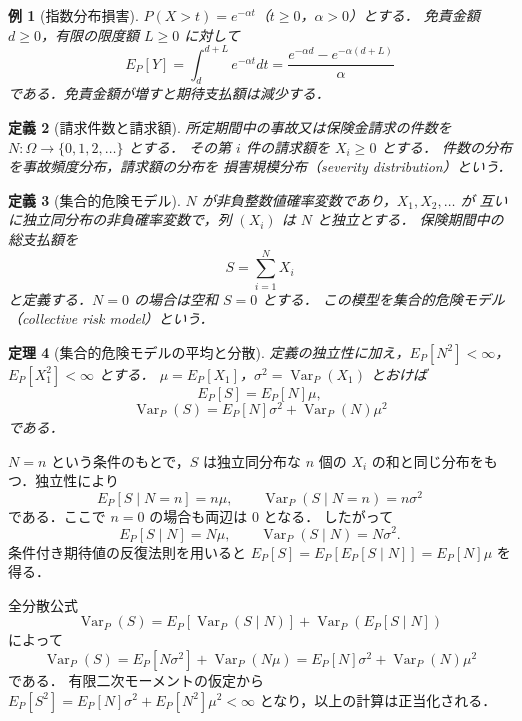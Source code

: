 \documentclass[a5paper,10pt,onecolumn]{jsarticle}
\makeatletter
\theoremstyle{mathnotetheorem}
\newtheorem{theorem}{定理}[section]
\newtheorem{definition}[theorem]{定義}
\newtheorem{example}[theorem]{例}
\renewcommand{\proofname}{証明}
\renewenvironment{proof}[1][\proofname]{%
  \par\pushQED{\qed}\normalfont\topsep4\p@\@plus2\p@\relax
  \trivlist\item[\hskip\labelsep\bfseries #1]\ignorespaces
}{\popQED\endtrivlist\@endpefalse}
\makeatother
\begin{document}
\begin{example}[指数分布損害]
$P(X>t)=e^{-\alpha t}$（$t\ge0$，$\alpha>0$）とする．
免責金額 $d\ge0$，有限の限度額 $L\ge0$ に対して
\[
 E_P[Y]=\int_d^{d+L}e^{-\alpha t}dt
 =\frac{e^{-\alpha d}-e^{-\alpha(d+L)}}{\alpha}
\]
である．免責金額が増すと期待支払額は減少する．
\end{example}

\begin{definition}[請求件数と請求額]
所定期間中の事故又は保険金請求の\emph{件数}を
$N:\Omega\to\{0,1,2,\ldots\}$ とする．
その第 $i$ 件の\emph{請求額}を $X_i\ge0$ とする．
件数の分布を\emph{事故頻度分布}，請求額の分布を
\emph{損害規模分布}（severity distribution）という．
\end{definition}

\begin{definition}[集合的危険モデル]
$N$ が非負整数値確率変数であり，$X_1,X_2,\ldots$ が
互いに独立同分布の非負確率変数で，列 $(X_i)$ は $N$ と独立とする．
保険期間中の総支払額を
\[
 S=\sum_{i=1}^{N}X_i
\]
と定義する．$N=0$ の場合は空和 $S=0$ とする．
この模型を\emph{集合的危険モデル}（collective risk model）という．
\end{definition}

\begin{theorem}[集合的危険モデルの平均と分散]\label{thm:aggregate}
定義の独立性に加え，$E_P[N^2]<\infty$，$E_P[X_1^2]<\infty$ とする．
$\mu=E_P[X_1]$，$\sigma^2=\operatorname{Var}_P(X_1)$ とおけば
\[
 E_P[S]=E_P[N]\mu,
\]
\begin{equation}\label{eq:aggregatevar}
 \operatorname{Var}_P(S)=E_P[N]\sigma^2
 +\operatorname{Var}_P(N)\mu^2
\end{equation}
である．
\end{theorem}
\begin{proof}
$N=n$ という条件のもとで，$S$ は独立同分布な $n$ 個の
$X_i$ の和と同じ分布をもつ．独立性により
\[
 E_P[S\mid N=n]=n\mu,\qquad
 \operatorname{Var}_P(S\mid N=n)=n\sigma^2
\]
である．ここで $n=0$ の場合も両辺は $0$ となる．
したがって
\[
 E_P[S\mid N]=N\mu,
 \qquad\operatorname{Var}_P(S\mid N)=N\sigma^2.
\]
条件付き期待値の反復法則を用いると
$E_P[S]=E_P[E_P[S\mid N]]=E_P[N]\mu$ を得る．

全分散公式
\[
 \operatorname{Var}_P(S)=
 E_P[\operatorname{Var}_P(S\mid N)]
 +\operatorname{Var}_P(E_P[S\mid N])
\]
によって
\[
 \operatorname{Var}_P(S)=E_P[N\sigma^2]
 +\operatorname{Var}_P(N\mu)
 =E_P[N]\sigma^2+\operatorname{Var}_P(N)\mu^2
\]
である．
有限二次モーメントの仮定から
$E_P[S^2]=E_P[N]\sigma^2+E_P[N^2]\mu^2<\infty$
となり，以上の計算は正当化される．\end{proof}
\end{document}
